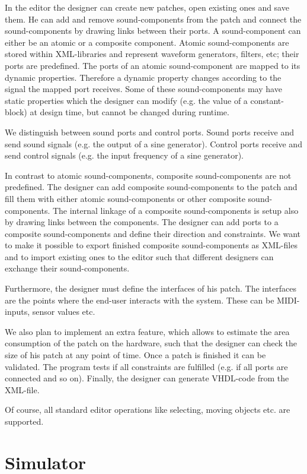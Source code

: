 In the editor the designer can create new patches, open existing ones and save them.
He can add and remove sound-components from the patch and connect the sound-components by drawing links between their ports.
A sound-component can either be an atomic or a composite component. 
Atomic sound-components are stored within XML-libraries and represent waveform generators, filters, etc; their ports are predefined. 
The ports of an atomic sound-component are mapped to its dynamic properties. Therefore a dynamic property changes according to the signal the mapped port receives.  
Some of these sound-components may have static properties which the designer can modify (e.g. the value of a constant-block) at design time, but cannot be changed during runtime. 

We distinguish between sound ports and control ports. Sound ports receive and send sound signals (e.g. the output of a sine generator). Control ports receive and send control signals (e.g. the input frequency of a sine generator).

In contrast to atomic sound-components, composite sound-components are not predefined. 
The designer can add composite sound-components to the patch and fill them with either atomic sound-components or other composite sound-components. The internal linkage of a composite sound-components is setup also by drawing links between the components.
The designer can add ports to a composite sound-components and define their direction and constraints. 
We want to make it possible to export finished composite sound-components as XML-files and to import existing ones to the editor such that different designers can exchange their sound-components.


Furthermore, the designer must define the interfaces of his patch. 
The interfaces are the points where the end-user interacts with the system. 
These can be MIDI-inputs, sensor values etc.

We also plan to implement an extra feature, which allows to estimate the area consumption of the patch on the hardware, such that the designer can check the size of his patch at any point of time. 
Once a patch is finished it can be validated. The program tests if all constraints are fulfilled (e.g. if all ports are connected and so on). Finally, the designer can generate VHDL-code from the XML-file.

Of course, all standard editor operations like selecting, moving objects etc. are supported.

\section{Simulator}

